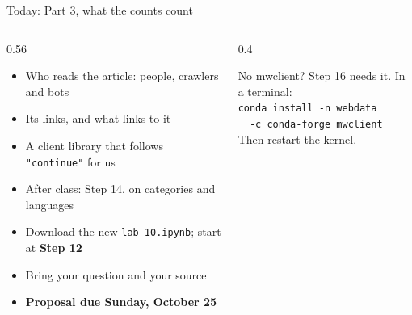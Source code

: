 \documentclass[9pt,aspectratio=169]{beamer}
\begin{document}
\begin{frame}{Today: Part 3, what the counts count}
    \begin{columns}[T]
        \begin{column}{0.56\textwidth}
            \begin{itemize}\small
                \item Who reads the article: people, crawlers and bots
                \item Its links, and what links to it
                \item A client library that follows \texttt{"continue"} for us
                \item After class: Step 14, on categories and languages
                \item Download the new \texttt{lab-10.ipynb}; start at \textbf{Step 12}
            \end{itemize}

            \medskip
            \begin{itemize}\small
                \item Bring your question and your source
                \item \textbf{Proposal due Sunday, October 25}
            \end{itemize}
        \end{column}
        \begin{column}{0.4\textwidth}
            \begin{alertblock}{No mwclient?}
                \footnotesize Step 16 needs it. In a terminal:\\
                \texttt{conda install -n webdata}\\
                \texttt{\ \ -c conda-forge mwclient}\\
                Then restart the kernel.
            \end{alertblock}
        \end{column}
    \end{columns}
\end{frame}
\end{document}
